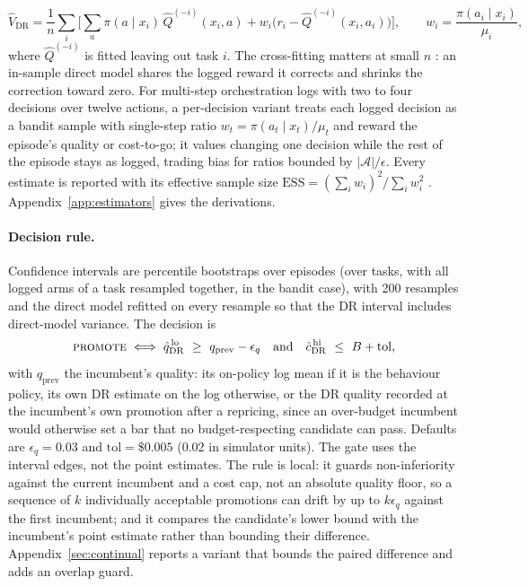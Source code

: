 \documentclass[10pt]{article}
\newcommand{\PROMOTE}{\textsc{promote}}
\begin{document}
\begin{equation}
\hat V_{\mathrm{DR}}=\frac1n\sum_i\Big[\sum_a\pi(a\mid x_i)\,\hat Q^{(-i)}(x_i,a)+w_i\big(r_i-\hat Q^{(-i)}(x_i,a_i)\big)\Big],\qquad w_i=\frac{\pi(a_i\mid x_i)}{\mu_i},
\label{eq:drbandit}
\end{equation}
where $\hat Q^{(-i)}$ is fitted leaving out task $i$. The cross-fitting matters at small $n$ \citep{chernozhukov2018dml}: an in-sample direct model shares the logged reward it corrects and shrinks the correction toward zero. For multi-step orchestration logs with two to four decisions over twelve actions, a per-decision variant treats each logged decision as a bandit sample with single-step ratio $w_t=\pi(a_t\mid x_t)/\mu_t$ and reward the episode's quality or cost-to-go; it values changing one decision while the rest of the episode stays as logged, trading bias for ratios bounded by $|\mathcal{A}|/\epsilon$. Every estimate is reported with its effective sample size $\mathrm{ESS}=(\sum_i w_i)^2/\sum_i w_i^2$ \citep{kish1965survey}. Appendix~\ref{app:estimators} gives the derivations.

\paragraph{Decision rule.} Confidence intervals are percentile bootstraps over episodes (over tasks, with all logged arms of a task resampled together, in the bandit case), with 200 resamples and the direct model refitted on every resample so that the DR interval includes direct-model variance. The decision is
\begin{equation}
\PROMOTE\iff \hat q^{\,\mathrm{lo}}_{\mathrm{DR}}\ \ge\ q_{\mathrm{prev}}-\epsilon_q
\quad\text{and}\quad
\hat c^{\,\mathrm{hi}}_{\mathrm{DR}}\ \le\ B+\mathrm{tol},
\label{eq:gate}
\end{equation}
with $q_{\mathrm{prev}}$ the incumbent's quality: its on-policy log mean if it is the behaviour policy, its own DR estimate on the log otherwise, or the DR quality recorded at the incumbent's own promotion after a repricing, since an over-budget incumbent would otherwise set a bar that no budget-respecting candidate can pass. Defaults are $\epsilon_q=0.03$ and $\mathrm{tol}=\$0.005$ (0.02 in simulator units). The gate uses the interval edges, not the point estimates. The rule is local: it guards non-inferiority against the current incumbent and a cost cap, not an absolute quality floor, so a sequence of $k$ individually acceptable promotions can drift by up to $k\epsilon_q$ against the first incumbent; and it compares the candidate's lower bound with the incumbent's point estimate rather than bounding their difference. Appendix~\ref{sec:continual} reports a variant that bounds the paired difference and adds an overlap guard.
\end{document}
